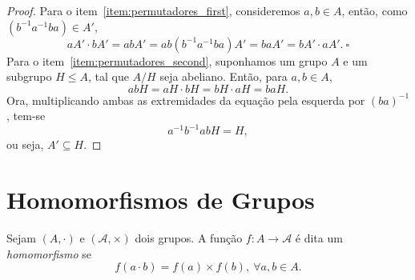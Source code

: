 \documentclass[11pt,openany]{book}
\begin{document}
\begin{proof}
    Para o item~\ref{item:permutadores_first}, consideremos $a,b \in A$, então, como $(b^{-1}a^{-1}ba) \in A'$,
    \[aA' \cdot bA' = abA' = ab(b^{-1}a^{-1}ba)A' = baA' = bA' \cdot aA'. \ \square\]
    Para o item~\ref{item:permutadores_second}, suponhamos um grupo $A$ e um subgrupo $H \leq A$, tal que $A/H$ seja abeliano. Então, para $a,b \in A$,
    \[abH = aH \cdot bH = bH \cdot aH = baH.\]
    Ora, multiplicando ambas as extremidades da equação pela esquerda por $(ba)^{-1}$, tem-se
    \[a^{-1}b^{-1}abH = H,\]
    ou seja, $A' \subseteq H$.
\end{proof}

\chapter{Homomorfismos de Grupos}

\begin{definition}
\label{def:homomorfismo}
    Sejam $(A, \cdot)$ e $(\mathcal{A}, \times)$ dois grupos. A função $f: A \rightarrow \mathcal{A}$ é dita um \textit{homomorfismo} se
    \[f(a\cdot b) = f(a) \times f(b), \ \forall a,b \in A.\]
\end{definition}
\end{document}
